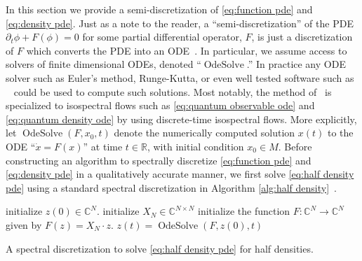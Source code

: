 \documentclass[final,leqno]{siamart}
\DeclareMathOperator{\OdeSolve}{OdeSolve}
\begin{document}
In this section we provide a semi-discretization of \eqref{eq:function pde} and \eqref{eq:density pde}.
Just as a note to the reader, a ``semi-discretization''  of the PDE $\partial_{t} \phi + F(\phi) = 0$ for some partial differential operator, $F$, is just a discretization of $F$ which 
converts the PDE into an ODE~\cite{Gottlieb1977numerical}.
In particular, we assume access to solvers of finite dimensional ODEs, denoted ``$\OdeSolve$.''
In practice any ODE solver such as Euler's method, Runge-Kutta, or even well tested software such as ~\cite{VODE} could be used to compute such solutions.
Most notably, the method of~\cite{Calvo1997} is specialized to isospectral flows such as  \eqref{eq:quantum observable ode} and \eqref{eq:quantum density ode} by using discrete-time isospectral flows.
More explicitly, let $\OdeSolve ( F , x_{0} , t )$ denote the numerically computed solution $x(t)$ to the ODE ``$\dot{x} = F(x)$'' at time $t \in \mathbb{R}$, with initial condition $x_{0} \in M$.
Before constructing an algorithm to spectrally discretize \eqref{eq:function pde} and \eqref{eq:density pde} in a qualitatively accurate manner, we first solve \eqref{eq:half density pde} using a standard spectral discretization in Algorithm \ref{alg:half density}~\cite{Boyd2001,NumericalRecipes}.

\begin{algorithm}
	initialize $z(0) \in \mathbb{C}^{N}$.\;
	initialize $X_{N} \in \mathbb{C}^{N \times N}$\;
	initialize the function $F: \mathbb{C}^{N} \to \mathbb{C}^{N}$ given by $F(z) = X_{N} \cdot z$.\;
	$z(t) = \operatorname{OdeSolve}(  F , z(0) , t)$\;
	\caption{A spectral discretization to solve \eqref{eq:half density pde} for half densities.} \label{alg:half density}
\end{algorithm}
\end{document}
